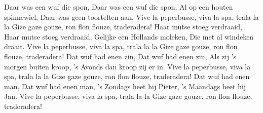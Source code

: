 \beginverse
Daar was een wuf die spon,
Daar was een wuf die spon,
Al op een houten spinnewiel,
Daar was geen toortelten aan.
Vive la peperbusse, viva la spa, trala la la
Gize gaze gouze, ron flon flouze, traderadera!
\endverse
\beginverse
Haar mutse stoeg verdraaid,
Haar mutse stoeg verdraaid,
Gelijke een Hollands moleken,
Die met al windeken draait.
Vive la peperbusse, viva la spa, trala la la
Gize gaze gouze, ron flon flouze, traderadera!
\endverse
\beginverse
Dat wuf had enen zin,
Dat wuf had enen zin,
Als zij 's morgen buiten kroop,
's Avonds dan kroop zij er in. 
Vive la peperbusse, viva la spa, trala la la
Gize gaze gouze, ron flon flouze, traderadera!
\endverse
\beginverse
Dat wuf had enen man,
Dat wuf had enen man,
's Zondags heet hij Pieter,
's Maandags heet hij Jan. 
Vive la peperbusse, viva la spa, trala la la
Gize gaze gouze, ron flon flouze, traderadera!
\endverse
\endsong